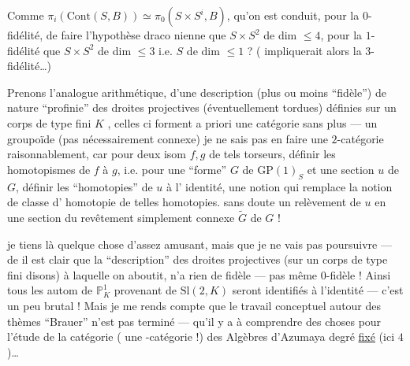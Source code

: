 Comme $\pi_i(\mathrm{Cont}(S,B))\simeq
\pi_0(S\times S^i,B)$,
 
qu'on est conduit, pour la $0$-%
fidélité, de faire l'hypothèse draco%
nienne que $S\times S^2$ de dim $\leq4$, pour la
$1$-fidélité que $S\times S^2$ de dim $\leq3$ i.e. $S$
de dim $\leq1$ ? ( impliquerait alors
la $3$-fidélité\ldots)

Prenons l'analogue arithmétique, d'une description
(plus ou moins ``fidèle'') 
de nature ``profinie''
des droites projectives  (éventuellement
tordues) définies sur un corps de type
fini $K$ ,
celles ci forment a priori une catégorie
sans plus --- un groupoïde (pas nécessairement
connexe) je ne sais pas en faire une
$2$-catégorie raisonnablement, car pour deux
isom $f,g$  de tels torseurs, définir les
homotopismes de $f$ à $g$, i.e. pour une ``forme''
$G$ de $\mathrm{GP}(1)_S$ et une section $u$ de $G$,
définir les ``homotopies'' de $u$ à l'%
identité, 
 une
notion qui remplace la notion de classe d'%
homotopie de telles homotopies.  
sans doute un relèvement de $u$ en une
section du 
revêtement simplement
connexe $\widetilde G$ de $G$ !

je tiens là quelque chose d'assez amusant,
mais que je ne vais pas poursuivre --- de
 il est clair que la ``description''
des droites projectives (sur un corps de
type fini disons) à laquelle on aboutit,
n'a rien de fidèle --- pas même $0$-fidèle !
Ainsi tous les autom de $\mathbb P^1_K$ provenant de
$\mathrm{Sl}(2,K)$ seront identifiés à l'identité ---
c'est un peu brutal ! Mais je me
rends compte que le travail conceptuel
autour des thèmes ``Brauer'' n'est pas
terminé --- qu'il y a à comprendre
des choses pour l'étude de la catégorie
( une -catégorie !)
des Algèbres d'Azumaya
 degré \uline{fixé} (ici $4$)\ldots
{}
